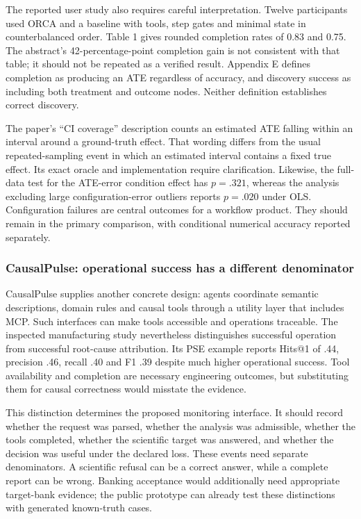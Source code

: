 The reported user study also requires careful interpretation. Twelve
participants used ORCA and a baseline with tools, step gates and minimal
state in counterbalanced order. Table 1 gives rounded completion rates
of 0.83 and 0.75. The abstract's 42-percentage-point completion gain is
not consistent with that table; it should not be repeated as a verified
result. Appendix E defines completion as producing an ATE regardless of
accuracy, and discovery success as including both treatment and outcome
nodes. Neither definition establishes correct discovery.
\citep{exec13_census_orca}

The paper's ``CI coverage'' description counts an estimated ATE
falling within an interval around a ground-truth effect. That wording
differs from the usual repeated-sampling event in which an estimated
interval contains a fixed true effect. Its exact oracle and
implementation require clarification. Likewise, the full-data test for
the ATE-error condition effect has \(p=.321\), whereas the analysis
excluding large configuration-error outliers reports \(p=.020\) under
OLS. Configuration failures are central outcomes for a workflow product.
They should remain in the primary comparison, with conditional numerical
accuracy reported separately.

\hypertarget{causalpulse-operational-success-has-a-different-denominator}{%
\subsubsection{CausalPulse: operational success has a different
denominator}\label{causalpulse-operational-success-has-a-different-denominator}}

CausalPulse supplies another concrete design: agents coordinate semantic
descriptions, domain rules and causal tools through a utility layer that
includes MCP. Such interfaces can make tools accessible and operations
traceable. The inspected manufacturing study nevertheless distinguishes
successful operation from successful root-cause attribution. Its PSE
example reports Hits@1 of .44, precision .46, recall .40 and F1 .39
despite much higher operational success. Tool availability and
completion are necessary engineering outcomes, but substituting them for
causal correctness would misstate the evidence. \citep{exec13_pulse}

This distinction determines the proposed monitoring interface. It should
record whether the request was parsed, whether the analysis was
admissible, whether the tools completed, whether the scientific target
was answered, and whether the decision was useful under the declared
loss. These events need separate denominators. A scientific refusal can
be a correct answer, while a complete report can be wrong. Banking
acceptance would additionally need appropriate target-bank evidence; the
public prototype can already test these distinctions with generated
known-truth cases.

